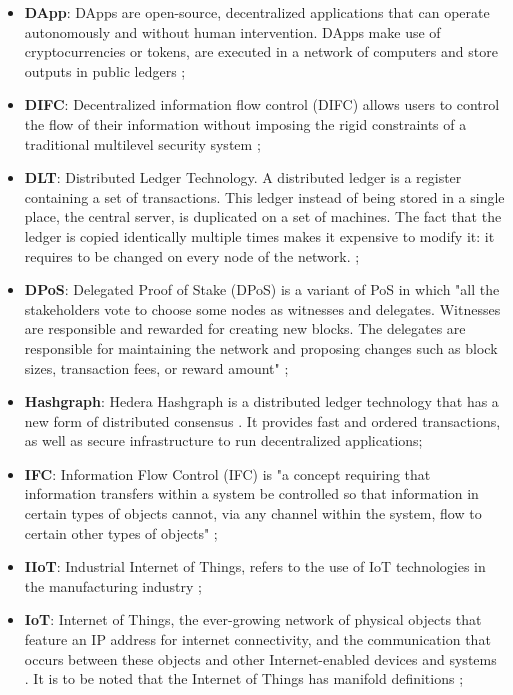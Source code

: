 \begin{itemize}
    \item[] \textbf{DApp}: DApps are open-source, decentralized applications that can operate autonomously and without human intervention. DApps make use of cryptocurrencies or tokens, are executed in a network of computers and store outputs in public ledgers \cite{Andoni2018};
    \item[] \textbf{DIFC}: Decentralized information flow control (DIFC) allows users to control the flow of their
    information without imposing the rigid constraints of a traditional
    multilevel security system \cite{Myers1997}; 
    \item[] \textbf{DLT}: Distributed Ledger Technology. A distributed ledger is a register containing a set of transactions.
    This ledger instead of being stored in a single place, the central
    server, is duplicated on a set of machines. The fact that the
    ledger is copied identically multiple times makes it expensive
    to modify it: it requires to be changed on every node of the network. \cite{Quiniou2019};
    \item[] \textbf{DPoS}: Delegated Proof of Stake (DPoS) is a variant of PoS in which "all the stakeholders vote to choose some nodes as witnesses and delegates. Witnesses are responsible and rewarded for creating new blocks. The delegates are responsible for maintaining the network
    and proposing changes such as block sizes, transaction fees, or reward amount" \cite{Salimitari2020};
    \item[] \textbf{Hashgraph}: Hedera Hashgraph is a distributed ledger technology that has a new form of distributed consensus \cite{Baird2018}. It provides fast and ordered transactions, as well as secure infrastructure to run decentralized applications; 
    \item[] \textbf{IFC}: Information Flow Control (IFC) \cite{Denning1976} is 
    "a concept requiring that information
    transfers within a system be controlled so that information in
    certain types of objects cannot, via any channel within the
    system, flow to certain other types of objects" \cite{rfc4949}  ;
    \item[] \textbf{IIoT}: Industrial Internet of Things, refers to the use of IoT technologies in the manufacturing industry \cite{Boyes2018};
    \item[] \textbf{IoT}: Internet of Things, the ever-growing network of physical objects that feature an IP address for internet connectivity, and the communication that occurs between these objects and other Internet-enabled devices and systems \cite{Berte2018}. It is to be noted that the Internet of Things has manifold definitions \cite{Atzori2010}; 

\end{itemize}
